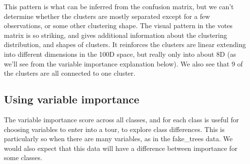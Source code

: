 \documentclass[
  letterpaper,
]{book}
\begin{document}
This pattern is what can be inferred from the confusion matrix, but we
can't determine whether the clusters are mostly separated except for a
few observations, or some other clustering shape. The visual pattern in
the votes matrix is so striking, and gives additional information about
the clustering distribution, and shapes of clusters. It reinforces the
clusters are linear extending into different dimensions in the 100D
space, but really only into about 8D (as we'll see from the variable
importance explanation below). We also see that 9 of the clusters are
all connected to one cluster.


\hypertarget{sec-forest-var-imp}{%
\subsection{Using variable importance}\label{sec-forest-var-imp}}

The variable importance score across all classes, and for each class is
useful for choosing variables to enter into a tour, to explore class
differences. This is particularly so when there are many variables, as
in the fake\_trees data. We would also expect that this data will have a
difference between importance for some classes.
\end{document}

